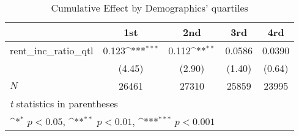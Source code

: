 \begin{table}[htbp]\centering
\def\sym#1{\ifmmode^{#1}\else\(^{#1}\)\fi}
\caption{Cumulative Effect by Demographics' quartiles}
\begin{tabular}{l*{4}{c}}
\hline\hline
            &\multicolumn{1}{c}{1st}&\multicolumn{1}{c}{2nd}&\multicolumn{1}{c}{3rd}&\multicolumn{1}{c}{4rd}\\
\hline
rent\_inc\_ratio\_qtl&       0.123\sym{***}&       0.112\sym{**} &      0.0586         &      0.0390         \\
            &      (4.45)         &      (2.90)         &      (1.40)         &      (0.64)         \\
\hline
\(N\)       &       26461         &       27310         &       25859         &       23995         \\
\hline\hline
\multicolumn{5}{l}{\footnotesize \textit{t} statistics in parentheses}\\
\multicolumn{5}{l}{\footnotesize \sym{*} \(p<0.05\), \sym{**} \(p<0.01\), \sym{***} \(p<0.001\)}\\
\end{tabular}
\end{table}
